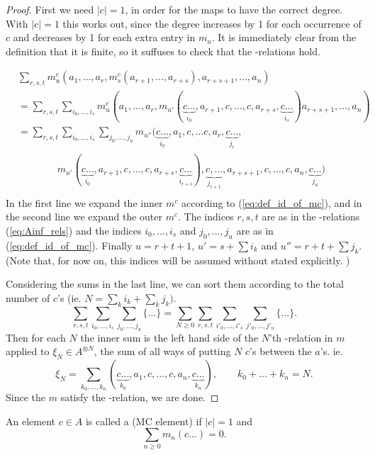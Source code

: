 \begin{proof}
First we need $|c| = 1$, in order for the maps to have the correct degree. With
$|c|=1$ this works out, since the degree increases by 1 for each occurrence of $c$
and decreases by 1 for each extra entry in $m_u$.  
It is immediately clear from the definition that it is finite, so it suffuses to
check that the \Ainf-relations hold.

\begin{align*}
&\sum_{r,s,t} m^c_u (a_1,...,a_r, m^c_s(a_{r+1},...,a_{r+s}), a_{r+s+1},...,a_{n}) \\
&= \sum_{r,s,t} \sum_{i_0,...,i_s} m^c_u (a_1,...,a_r, 
m_{u'}(\underbrace{c...}_{i_{0}},a_{r+1},c,...,c,a_{r+s},\underbrace{c...}_{i_{s}})
a_{r+s+1},...,a_{n})\\
&= \sum_{r,s,t} \sum_{i_0,...,i_s} \sum_{j_0,...,j_{u}} m_{u''} (\underbrace{c...}_{i_0},a_1,c,...c,a_r,\underbrace{c...}_{j_r}, \\
& \qquad\qquad 
m_{u'}(\underbrace{c...}_{i_0},a_{r+1},c,...,c,a_{r+s},\underbrace{c...}_{i_{r+s}}),
\underbrace{c,...}_{j_{r+1}},a_{r+s+1},c,...,c,a_{n},\underbrace{c...}_{j_u}) \\
\end{align*}
In the first line we expand the inner $m^c$ according to
(\ref{eq:def_id_of_mc}), and in the second line we expand the outer $m^c$. The
indices $r,s,t$ are as in the \Ainf-relations (\ref{eq:Ainf_rels}) and the
indices $i_0,...,i_s$ and $j_0,...,j_u$ are as in (\ref{eq:def_id_of_mc}).
Finally $u=r+t+1$, $u' = s + \sum i_k$ and $u'' = r+t+\sum j_k$. (Note that, for
now on, this indices will be assumed without stated explicitly. ) 

Considering the sums in the last line, we can sort them according to the total
number of $c$'s (ie. $N = \sum_k i_k + \sum_k j_k)$. 
\[ \sum_{r,s,t} \sum_{i_0,...,i_s} \sum_{j_0,...,j_{u}} \{ ... \}
= \sum_{N \ge 0} \sum_{r,s,t} \sum_{i'_0,...,i'_s} \sum_{j'_0,...,j'_u} \{
... \}. \]
Then for each $N$ the inner sum is the left hand side of the $N$'th \Ainf-relation in $m$ applied to $\xi_N \in A^{\otimes N}$, the sum of all ways of putting $N$ $c$'s between the $a$'s. ie.
\[  \xi_N = \sum_{k_0,...,k_n} (\underbrace{c...}_{k_0}, a_1, c,...,c, a_n,
\underbrace{c...}_{k_n}),
\qquad k_0+...+k_n = N. \] 
Since the $m$ satisfy the \Ainf-relation, we are done.
\end{proof}

\begin{defn}
An element $c \in A$ is called a  (MC element) if $|c| = 1$ and 
\[ \sum_{n \ge 0} m_n(c...) = 0. \]
\end{defn}

